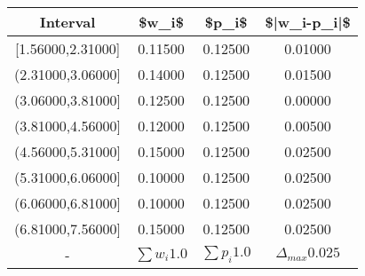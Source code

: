 %
\normalsize%
\begin{longtabu}spread 0pt{|c|c|c|c|}%
\hline%
Interval&\$w\_i\$&\$p\_i\$&\$|w\_i{-}p\_i|\$\\%
\hline%
{[}1.56000,2.31000{]}&0.11500&0.12500&0.01000\\%
\hline%
(2.31000,3.06000{]}&0.14000&0.12500&0.01500\\%
\hline%
(3.06000,3.81000{]}&0.12500&0.12500&0.00000\\%
\hline%
(3.81000,4.56000{]}&0.12000&0.12500&0.00500\\%
\hline%
(4.56000,5.31000{]}&0.15000&0.12500&0.02500\\%
\hline%
(5.31000,6.06000{]}&0.10000&0.12500&0.02500\\%
\hline%
(6.06000,6.81000{]}&0.10000&0.12500&0.02500\\%
\hline%
(6.81000,7.56000{]}&0.15000&0.12500&0.02500\\%
\hline%
{-}&$\sum w_i 1.0$&$\sum p_i 1.0$&$\Delta_{max}0.025$\\%
\hline%
\end{longtabu}%
%